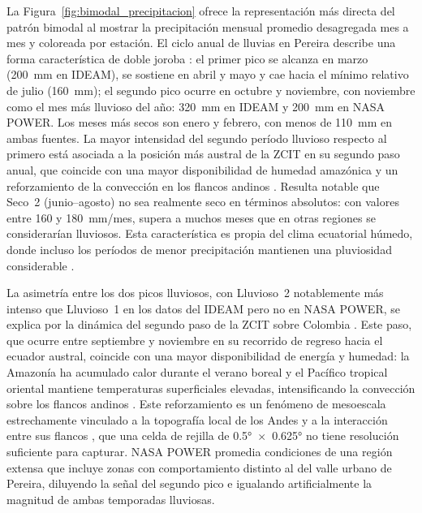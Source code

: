 \documentclass[12pt, a4paper]{article}
\begin{document}
La Figura~\ref{fig:bimodal_precipitacion} ofrece la representación más directa del
patrón bimodal al mostrar la precipitación mensual promedio desagregada mes a mes
y coloreada por estación. El ciclo anual de lluvias en Pereira describe una forma
característica de doble joroba \cite{urrea2019, poveda2005}: el primer pico se alcanza en marzo (200~mm en IDEAM), se sostiene en abril y mayo y cae hacia el mínimo relativo de julio (160~mm); el segundo pico ocurre en octubre y noviembre, con noviembre como el mes más lluvioso del año: 320~mm en IDEAM y 200~mm en NASA POWER. Los meses más secos son enero y febrero, con menos de 110~mm en ambas
fuentes. La mayor intensidad del segundo período lluvioso respecto al primero está
asociada a la posición más austral de la ZCIT en su segundo paso anual, que coincide
con una mayor disponibilidad de humedad amazónica y un reforzamiento de la convección
en los flancos andinos \cite{hoyos2018, poveda2011}. Resulta notable que Seco~2
(junio--agosto) no sea realmente seco en términos absolutos: con valores entre 160
y 180~mm/mes, supera a muchos meses que en otras regiones se considerarían lluviosos.
Esta característica es propia del clima ecuatorial húmedo, donde incluso los períodos
de menor precipitación mantienen una pluviosidad considerable \cite{poveda2004}.

La asimetría entre los dos picos lluviosos, con Lluvioso~2 notablemente más intenso
que Lluvioso~1 en los datos del IDEAM pero no en NASA POWER, se explica por la
dinámica del segundo paso de la ZCIT sobre Colombia \cite{urrea2019}. Este paso,
que ocurre entre septiembre y noviembre en su recorrido de regreso hacia el ecuador
austral, coincide con una mayor disponibilidad de energía y humedad: la Amazonía ha
acumulado calor durante el verano boreal y el Pacífico tropical oriental mantiene
temperaturas superficiales elevadas, intensificando la convección sobre los flancos
andinos \cite{hoyos2018, poveda2011}. Este reforzamiento es un fenómeno de mesoescala
estrechamente vinculado a la topografía local de los Andes y a la interacción entre
sus flancos \cite{poveda2004}, que una celda de rejilla de 0.5°~$\times$~0.625° no
tiene resolución suficiente para capturar. NASA POWER promedia
condiciones de una región extensa que incluye zonas con comportamiento distinto al
del valle urbano de Pereira, diluyendo la señal del segundo pico e igualando
artificialmente la magnitud de ambas temporadas lluviosas.
\end{document}
